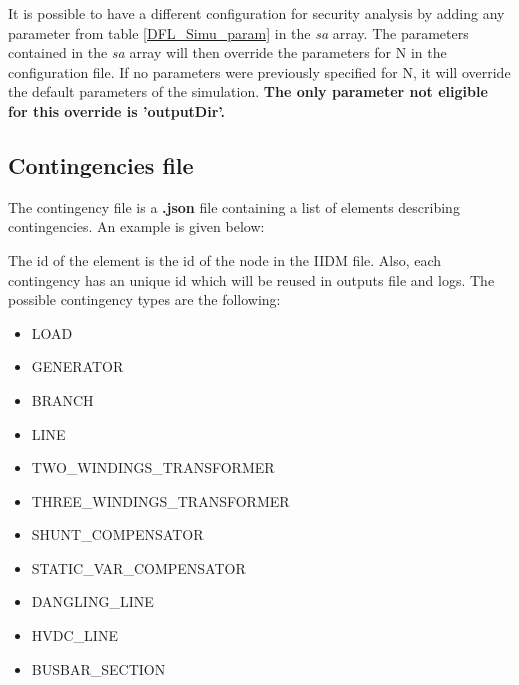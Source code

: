 \documentclass[a4paper, 12pt]{report}
\begin{document}
It is possible to have a different configuration for security analysis by adding any parameter from table \ref{DFL_Simu_param} in the \textit{sa} array.
The parameters contained in the \textit{sa} array will then override the parameters for N in the configuration file.
If no parameters were previously specified for N, it will override the default parameters of the simulation.
\textbf{The only parameter not eligible for this override is 'outputDir'.}




\subsection{Contingencies file}

The contingency file is a \textbf{.json} file containing a list of elements describing contingencies. An example is given below:


The id of the element is the id of the node in the IIDM file.
Also, each contingency has an unique id which will be reused in outputs file and logs.
The possible contingency types are the following:
\begin{itemize}
  \item LOAD
  \item GENERATOR
  \item BRANCH
  \item LINE
  \item TWO\_WINDINGS\_TRANSFORMER
  \item THREE\_WINDINGS\_TRANSFORMER
  \item SHUNT\_COMPENSATOR
  \item STATIC\_VAR\_COMPENSATOR
  \item DANGLING\_LINE
  \item HVDC\_LINE
  \item BUSBAR\_SECTION
\end{itemize}
\end{document}
